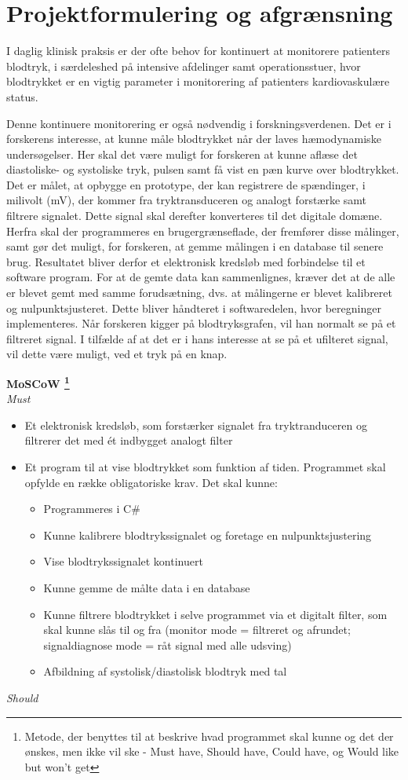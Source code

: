 \chapter{Projektformulering og afgrænsning}
I daglig klinisk praksis er der ofte behov for kontinuert at monitorere patienters blodtryk, i særdeleshed på intensive afdelinger samt operationsstuer, hvor blodtrykket er en vigtig parameter i monitorering af patienters kardiovaskulære status.


Denne kontinuere monitorering er også nødvendig i forskningsverdenen. Det er i forskerens interesse, at kunne måle blodtrykket når der laves hæmodynamiske undersøgelser. Her skal det være muligt for forskeren at kunne aflæse det diastoliske- og systoliske tryk, pulsen samt få vist en pæn kurve over blodtrykket. Det er målet, at opbygge en prototype, der kan registrere de spændinger, i milivolt (mV), der kommer fra tryktransduceren og analogt forstærke samt filtrere signalet. Dette signal skal derefter konverteres til det digitale domæne. \\
Herfra skal der programmeres en brugergrænseflade, der fremfører disse målinger, samt gør det muligt, for forskeren, at gemme målingen i en database til senere brug. Resultatet bliver derfor et elektronisk kredsløb med forbindelse til et software program.
For at de gemte data kan sammenlignes, kræver det at de alle er blevet gemt med samme forudsætning, dvs. at målingerne er blevet kalibreret og nulpunktsjusteret. Dette bliver håndteret i softwaredelen, hvor beregninger implementeres. Når forskeren kigger på blodtryksgrafen, vil han normalt se på et filtreret signal. I tilfælde af at det er i hans interesse at se på et ufilteret signal, vil dette være muligt, ved et tryk på en knap.

\textbf{MoSCoW \footnote{Metode, der benyttes til at beskrive hvad programmet skal kunne og det der ønskes, men ikke vil ske - Must have, Should have, Could have, og Would like but won't get}}
\\
\textit{Must}
\begin{itemize}
\item Et elektronisk kredsløb, som forstærker signalet fra tryktranduceren og filtrerer det med ét indbygget analogt filter
\item Et program til at vise blodtrykket som funktion af tiden. Programmet skal opfylde en række obligatoriske krav. Det skal kunne:
\begin{itemize}
\item Programmeres i C\#
\item Kunne kalibrere blodtrykssignalet og foretage en nulpunktsjustering
\item Vise blodtrykssignalet kontinuert
\item Kunne gemme de målte data i en database
\item Kunne filtrere blodtrykket i selve programmet via et digitalt filter, som skal kunne slås til og fra (monitor mode = filtreret og afrundet; signaldiagnose mode = råt signal med alle udsving)
\item Afbildning af systolisk/diastolisk blodtryk med tal
\end{itemize}
\end{itemize}
\textit{Should}

